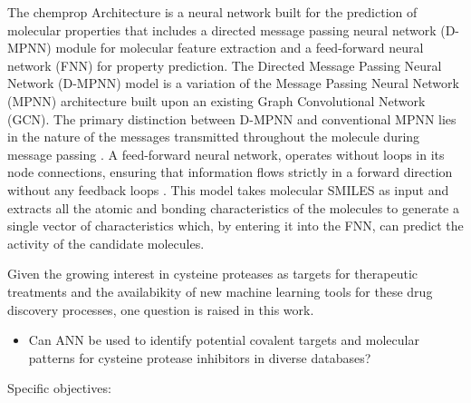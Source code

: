 \documentclass[final,times,twocolumn,article]{elsarticle}
\begin{document}
The chemprop Architecture is a neural network built for the prediction of molecular properties that includes a directed message passing neural network (D-MPNN) module for molecular feature extraction and a feed-forward neural network (FNN) for property prediction. The Directed Message Passing Neural Network (D-MPNN) model is a variation of the Message Passing Neural Network (MPNN) architecture built upon an existing Graph Convolutional Network (GCN). The primary distinction between D-MPNN and conventional MPNN lies in the nature of the messages transmitted throughout the molecule during message passing \cite{Yang2019}. A feed-forward neural network, operates without loops in its node connections, ensuring that information flows strictly in a forward direction without any feedback loops \cite{Wallisch2009}.
This model takes molecular SMILES as input and extracts all the atomic and bonding characteristics of the molecules to generate a single vector of characteristics which, by entering it into the FNN, can predict the activity of the candidate molecules. \cite{Wang2022}

Given the growing interest in cysteine proteases as targets for therapeutic treatments and the availabikity of new machine learning tools for these drug discovery processes, one question is raised in this work.

\begin{itemize}
    \item Can ANN be used to identify potential covalent targets and molecular patterns for cysteine protease inhibitors in diverse databases?

    
\end{itemize}

Specific objectives:
\end{document}
